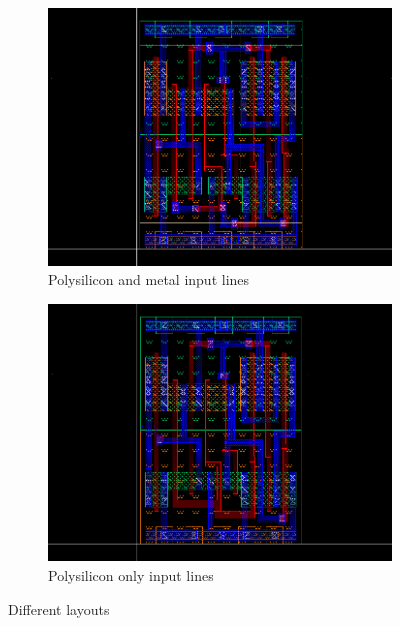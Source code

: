 \documentclass[a4paper]{article}
\begin{document}
\begin{figure}[H]
    \centering
    \begin{subfigure}[h]{\textwidth}
        \centering
        \includegraphics[width=\linewidth]{./Images/HA/HAX1_poly-metal_layout.png}
        \caption{Polysilicon and metal input lines}
		\label{fig: polymetal}
    \end{subfigure}
    \begin{subfigure}[b]{\textwidth}
        \centering
        \includegraphics[width=\linewidth]{./Images/HA/HAX1_poly_layout.png}
        \caption{Polysilicon only input lines}
		\label{fig:poly}
    \end{subfigure}
    \caption{Different layouts}
    \label{fig: HAX1_layouts}
\end{figure}
\end{document}
